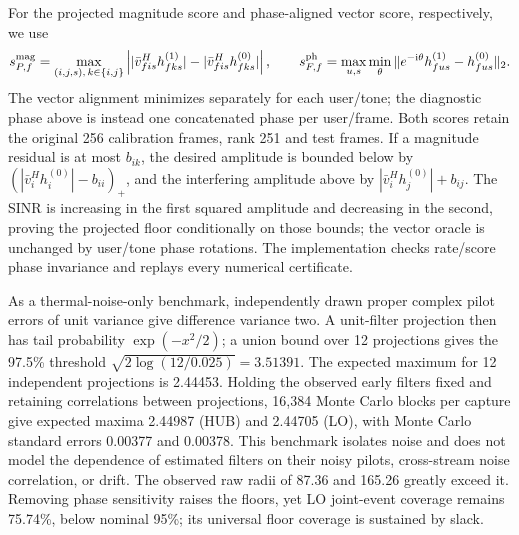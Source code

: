 \documentclass[10pt,letterpaper]{article}
\begin{document}
For the projected magnitude score and phase-aligned vector score, respectively, we use
\[
s^{\rm mag}_{P,f}=\max_{(i,j,s),\,k\in\{i,j\}}
\left||\bar v_{fis}^Hh^{(1)}_{fks}|-|\bar v_{fis}^Hh^{(0)}_{fks}|\right|,
\qquad
s^{\rm ph}_{F,f}=\max_{u,s}\min_\theta
\|e^{-{\rm i}\theta}h^{(1)}_{fus}-h^{(0)}_{fus}\|_2 .
\]
The vector alignment minimizes separately for each user/tone; the diagnostic phase above is instead one concatenated phase per user/frame. Both scores retain the original 256 calibration frames, rank 251 and test frames. If a magnitude residual is at most \(b_{ik}\), the desired amplitude is bounded below by \((|\bar v_i^Hh_i^{(0)}|-b_{ii})_+\), and the interfering amplitude above by \(|\bar v_i^Hh_j^{(0)}|+b_{ij}\). The SINR is increasing in the first squared amplitude and decreasing in the second, proving the projected floor conditionally on those bounds; the vector oracle is unchanged by user/tone phase rotations. The implementation checks rate/score phase invariance and replays every numerical certificate.

As a thermal-noise-only benchmark, independently drawn proper complex pilot errors of unit variance give difference variance two. A unit-filter projection then has tail probability \(\exp(-x^2/2)\); a union bound over 12 projections gives the 97.5\% threshold \(\sqrt{2\log(12/0.025)}=3.51391\). The expected maximum for 12 independent projections is 2.44453. Holding the observed early filters fixed and retaining correlations between projections, 16,384 Monte Carlo blocks per capture give expected maxima 2.44987 (HUB) and 2.44705 (LO), with Monte Carlo standard errors 0.00377 and 0.00378. This benchmark isolates noise and does not model the dependence of estimated filters on their noisy pilots, cross-stream noise correlation, or drift. The observed raw radii of 87.36 and 165.26 greatly exceed it. Removing phase sensitivity raises the floors, yet LO joint-event coverage remains 75.74\%, below nominal 95\%; its universal floor coverage is sustained by slack.
\end{document}
